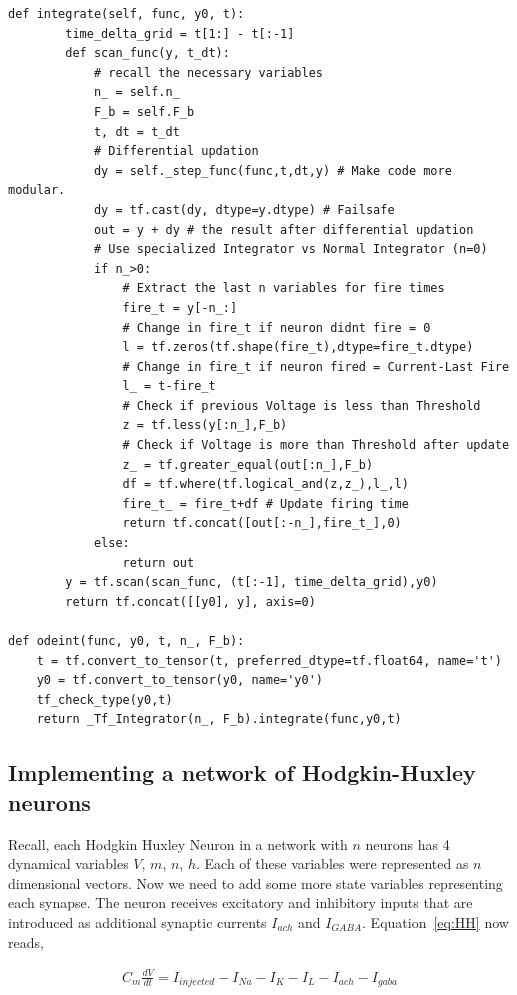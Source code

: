 \documentclass[10pt,letterpaper]{article}
\begin{document}
\begin{nolinenumbers}
\begin{verbatim}
def integrate(self, func, y0, t): 
        time_delta_grid = t[1:] - t[:-1]
        def scan_func(y, t_dt): 
            # recall the necessary variables
            n_ = self.n_
            F_b = self.F_b
            t, dt = t_dt
            # Differential updation
            dy = self._step_func(func,t,dt,y) # Make code more modular.
            dy = tf.cast(dy, dtype=y.dtype) # Failsafe
            out = y + dy # the result after differential updation
            # Use specialized Integrator vs Normal Integrator (n=0)
            if n_>0:
                # Extract the last n variables for fire times
                fire_t = y[-n_:] 
                # Change in fire_t if neuron didnt fire = 0
                l = tf.zeros(tf.shape(fire_t),dtype=fire_t.dtype) 
                # Change in fire_t if neuron fired = Current-Last Fire
                l_ = t-fire_t 
                # Check if previous Voltage is less than Threshold
                z = tf.less(y[:n_],F_b)              
                # Check if Voltage is more than Threshold after update
                z_ = tf.greater_equal(out[:n_],F_b)  
                df = tf.where(tf.logical_and(z,z_),l_,l) 
                fire_t_ = fire_t+df # Update firing time 
                return tf.concat([out[:-n_],fire_t_],0)
            else:
                return out
        y = tf.scan(scan_func, (t[:-1], time_delta_grid),y0)
        return tf.concat([[y0], y], axis=0)
        
def odeint(func, y0, t, n_, F_b):
    t = tf.convert_to_tensor(t, preferred_dtype=tf.float64, name='t')
    y0 = tf.convert_to_tensor(y0, name='y0')
    tf_check_type(y0,t)
    return _Tf_Integrator(n_, F_b).integrate(func,y0,t)
\end{verbatim}

\subsection*{Implementing a network of Hodgkin-Huxley neurons}

Recall, each Hodgkin Huxley Neuron in a network with $n$ neurons has 4 dynamical variables $V$, $ m$, $n$, $h$. Each of these variables were represented as $n$\textemdash dimensional vectors. Now we need to add some more state variables representing each synapse. The neuron receives excitatory and inhibitory inputs that are introduced as additional synaptic currents $I_{ach}$ and $I_{GABA}$. Equation~\ref{eq:HH} now reads, 

\begin{eqnarray}C_m\frac{dV}{dt} = I_{injected} - I_{Na} - I_K - I_L - I_{ach} - I_{gaba}\end{eqnarray}


\end{nolinenumbers}
\end{document}
